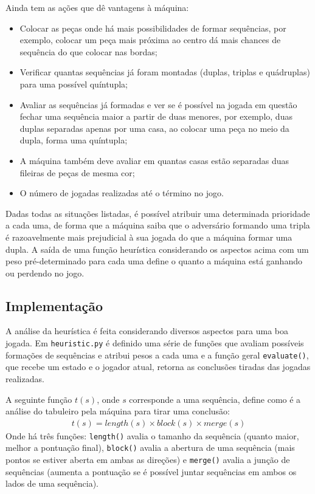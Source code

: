 \documentclass{article}
\begin{document}
        Ainda tem as ações que dê vantagens à máquina:
        \begin{itemize}
            \item Colocar as peças onde há mais possibilidades de formar
                sequências, por exemplo, colocar um peça mais próxima ao centro
                dá mais chances de sequência do que colocar nas bordas;
            \item Verificar quantas sequências já foram montadas (duplas,
                triplas e quádruplas) para uma possível quíntupla;
            \item Avaliar as sequências já formadas e ver se é possível na
                jogada em questão fechar uma sequência maior a partir de duas
                menores, por exemplo, duas duplas separadas apenas por uma
                casa, ao colocar uma peça no meio da dupla, forma uma
                quíntupla;
            \item A máquina também deve avaliar em quantas casas estão
                separadas duas fileiras de peças de mesma cor;
            \item O número de jogadas realizadas até o término no jogo.
        \end{itemize}
        
        Dadas todas as situações listadas, é possível atribuir uma determinada
        prioridade a cada uma, de forma que a máquina saiba que o adversário
        formando uma tripla é razoavelmente mais prejudicial à sua jogada do
        que a máquina formar uma dupla. A saída de uma função heurística
        considerando os aspectos acima com um peso pré-determinado para cada
        uma define o quanto a máquina está ganhando ou perdendo no jogo.
        
        \subsection*{Implementação}
        A análise da heurística é feita considerando diversos aspectos para uma
        boa jogada. Em \texttt{heuristic.py} é definido uma série de funções
        que avaliam possíveis formações de sequências e atribui pesos a cada
        uma e a função geral \texttt{evaluate()}, que recebe um estado e o
        jogador atual, retorna as conclusões tiradas das jogadas realizadas.
        
        A seguinte função $t(s)$, onde $s$ corresponde a uma sequência, define
        como é a análise do tabuleiro pela máquina para tirar uma conclusão:
        \begin{gather*}
            t(s) = length(s) \times block(s) \times merge(s)
        \end{gather*}
        Onde há três funções: \texttt{length()} avalia o tamanho da sequência
        (quanto maior, melhor a pontuação final), \texttt{block()} avalia a
        abertura de uma sequência (mais pontos se estiver aberta em ambas as
        direções) e \texttt{merge()} avalia a junção de sequências (aumenta a
        pontuação se é possível juntar sequências em ambos os lados de uma
        sequência).
        
\end{document}
